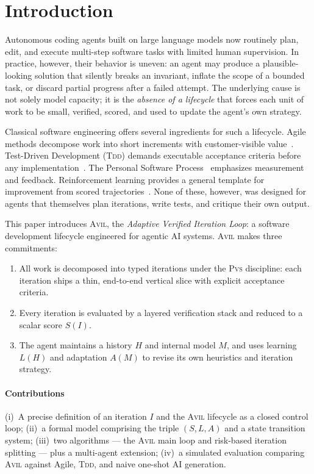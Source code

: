 \documentclass[10pt,twocolumn,letterpaper]{article}
\theoremstyle{definition}
\theoremstyle{plain}
\newcommand{\AVIL}{\textsc{Avil}}
\newcommand{\PVS}{\textsc{Pvs}}
\newcommand{\TDD}{\textsc{Tdd}}
\begin{document}
\section{Introduction}\label{sec:introduction}

Autonomous coding agents built on large language models now routinely
plan, edit, and execute multi-step software tasks with limited human
supervision. In practice, however, their behavior is uneven: an agent
may produce a plausible-looking solution that silently breaks an
invariant, inflate the scope of a bounded task, or discard partial
progress after a failed attempt. The underlying cause is not solely
model capacity; it is the \emph{absence of a lifecycle} that forces
each unit of work to be small, verified, scored, and used to update
the agent's own strategy.

Classical software engineering offers several ingredients for such a
lifecycle. Agile methods decompose work into short increments with
customer-visible value~\citep{beck2001agile}. Test-Driven Development
(\TDD{}) demands executable acceptance criteria before any
implementation~\citep{beck2002tdd}. The Personal Software
Process~\citep{humphrey1995psp} emphasizes measurement and feedback.
Reinforcement learning provides a general template for improvement
from scored trajectories~\citep{sutton2018rl}. None of these, however,
was designed for agents that themselves plan iterations, write tests,
and critique their own output.

This paper introduces \AVIL{}, the \emph{Adaptive Verified Iteration
Loop}: a software development lifecycle engineered for agentic AI
systems. \AVIL{} makes three commitments:
\begin{enumerate}\itemsep2pt
\item All work is decomposed into typed iterations under the \PVS{}
  discipline: each iteration ships a thin, end-to-end vertical slice
  with explicit acceptance criteria.
\item Every iteration is evaluated by a layered verification stack and
  reduced to a scalar score $S(I)$.
\item The agent maintains a history $H$ and internal model $M$, and
  uses learning $L(H)$ and adaptation $A(M)$ to revise its own
  heuristics and iteration strategy.
\end{enumerate}

\paragraph{Contributions}
(i)~A precise definition of an iteration $I$ and the \AVIL{} lifecycle
as a closed control loop;
(ii)~a formal model comprising the triple $(S, L, A)$ and a state
transition system;
(iii)~two algorithms — the \AVIL{} main loop and risk-based iteration
splitting — plus a multi-agent extension;
(iv)~a simulated evaluation comparing \AVIL{} against Agile, \TDD{},
and naive one-shot AI generation.
\end{document}
